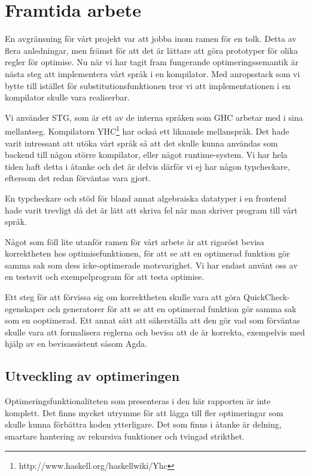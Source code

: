 \documentclass[Rapport]{subfiles}
\begin{document}
\section{Framtida arbete}
En avgränsning för vårt projekt var att jobba inom ramen för en tolk. 
Detta av flera anledningar, men främst för att det är lättare att göra prototyper för 
olika regler för optimise. Nu när vi har tagit fram fungerande optimeringssemantik 
är nästa steg att implementera vårt språk i en kompilator.
Med anropsstack som vi bytte till istället för substitutionsfunktionen tror vi att implementationen
i en kompilator skulle vara realiserbar.


Vi använder STG, som är ett av de interna språken som GHC arbetar med i sina
mellantseg. Kompilatorn YHC\footnote{http://www.haskell.org/haskellwiki/Yhc} 
har också ett liknande mellanspråk.
Det hade varit intressant att utöka vårt språk så att det skulle kunna 
användas som backend till någon större kompilator, eller något runtime-system.
Vi har hela tiden haft detta i åtanke och det är delvis därför vi ej har någon 
typcheckare, eftersom det redan förväntas vara gjort.


En typcheckare och stöd för bland annat algebraiska datatyper i en 
frontend hade varit trevligt då det är lätt att skriva fel när man skriver
program till vårt språk. 


Något som föll lite utanför ramen för vårt arbete är att rigoröst bevisa
korrektheten hos optimisefunktionen, för att se att en optimerad funktion
gör samma sak som dess icke-optimerade motsvarighet. Vi har endast använt oss av en testsvit
och exempelprogram för att testa optimise. 

Ett steg för att förvissa sig om korrektheten skulle vara att göra QuickCheck-egenskaper och generatorer för att se att en optimerad funktion gör samma sak som en ooptimerad. 
Ett annat sätt att säkerställa att den
gör vad som förväntas skulle vara att formalisera reglerna och bevisa
att de är korrekta, exempelvis med hjälp av en bevisassistent såsom Agda.

\subsection{Utveckling av optimeringen}

Optimeringsfunktionaliteten som presenteras i den här rapporten är inte
komplett. Det finns mycket utrymme för att lägga till fler optimeringar
som skulle kunna förbättra koden ytterligare. Det som finns i åtanke är
delning, smartare hantering av rekursiva funktioner och tvingad strikthet.
\end{document}
